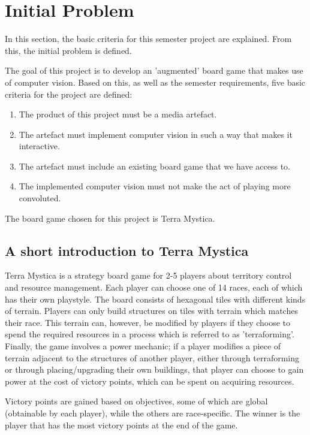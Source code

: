 \chapter{Initial Problem}\label{ch:iniprob}
In this section, the basic criteria for this semester project are explained. From this, the initial problem is defined.

The goal of this project is to develop an 'augmented' board game that makes use of computer vision. Based on this, as well as the semester requirements, five basic criteria for the project are defined:

\begin{enumerate}
	\item The product of this project must be a media artefact.
	\item The artefact must implement computer vision in such a way that makes it interactive.
	\item The artefact must include an existing board game that we have access to.
	\item The implemented computer vision must not make the act of playing more convoluted.
\end{enumerate}

The board game chosen for this project is Terra Mystica.

\section{A short introduction to Terra Mystica}
Terra Mystica is a strategy board game for 2-5 players about territory control and resource management. Each player can choose one of 14 races, each of which has their own playstyle. The board consists of hexagonal tiles  with different kinds of terrain. Players can only build structures on tiles with terrain which matches their race. This terrain can, however, be modified by players if they choose to spend the required resources in a process which is referred to as 'terraforming'. Finally, the game involves a power mechanic; if a player modifies a piece of terrain adjacent to the structures of another player, either through terraforming or through placing/upgrading their own buildings, that player can choose to gain power at the cost of victory points, which can be spent on acquiring resources.  

Victory points are gained based on objectives, some of which are global (obtainable by each player), while the others are race-specific. The winner is the player that has the most victory points at the end of the game.


